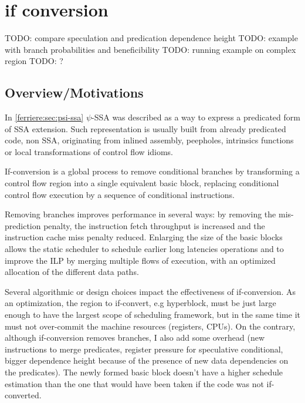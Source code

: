 \chapter{if conversion }
\graphicspath{{img/}{/if_conversion/img}{part4/if_conversion/img/}}
	
\newcommand\cond{~?~}

TODO: compare speculation and predication dependence height
TODO: example with branch probabilities and beneficibility
TODO: running example on complex region
TODO: ?

\section{Overview/Motivations}

In \ref{ferriere:sec:psi-ssa} $\psi$-SSA was described as a way to express a predicated form of SSA extension. Such representation is usually built from already predicated code, non SSA, originating from inlined assembly, peepholes, intrinsics functions or local transformations of control flow idioms.

If-conversion is a global process to remove conditional branches by transforming a control flow region into a single equivalent basic block, replacing conditional control flow execution by a sequence of conditional instructions. 

Removing branches improves performance in several ways: by removing the mis-prediction penalty, the instruction fetch throughput is increased and the instruction cache miss penalty reduced. Enlarging the size of the basic blocks allows the static scheduler to schedule earlier long latencies operations and to improve the ILP by merging multiple flows of execution, with an optimized allocation of the different data paths. 

Several algorithmic or design choices impact the effectiveness of if-conversion. As an optimization, the region to if-convert, e.g hyperblock, must be just large enough to have the largest scope of scheduling framework, but in the same time it must not over-commit the machine resources (registers, CPUs). On the contrary, although if-conversion removes branches, I also add some overhead (new instructions to merge predicates, register pressure for speculative conditional, bigger dependence height because of the presence of new data dependencies on the predicates). The newly formed basic block doesn't have a higher schedule estimation than the one that would have been taken if the code was not if-converted.

